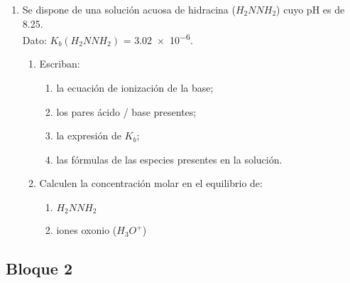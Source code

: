 \documentclass[../practica.root.tex]{subfiles}
\begin{document}
\begin{enumerate}
	\item Se dispone de una solución acuosa de hidracina ($H_2NNH_2$) cuyo pH es de \num{8,25}. \\
	      Dato: $K_b(H_2NNH_2)$ = \num{3,02e-6}.
	      \begin{enumerate}
		      \item Escriban:
		            \begin{enumerate}
			            \item la ecuación de ionización de la base;
			            \item los pares ácido / base presentes;
			            \item la expresión de $K_b$;
			            \item las fórmulas de las especies presentes en la solución.
		            \end{enumerate}
		      \item Calculen la concentración molar en el equilibrio de:
		            \begin{enumerate}
			            \item $H_2NNH_2$
			            \item iones oxonio ($H_3O^+$)
		            \end{enumerate}
	      \end{enumerate}
\end{enumerate}
\subsection{Bloque 2}%
\end{document}
